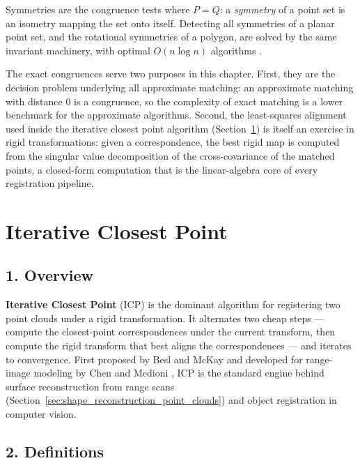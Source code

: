 Symmetries are the congruence tests where $P = Q$: a \emph{symmetry} of a
point set is an isometry mapping the set onto itself. Detecting all
symmetries of a planar point set, and the rotational symmetries of a
polygon, are solved by the same invariant machinery, with optimal
$O(n \log n)$ algorithms \cite{atallah1985symmetry,wolter1985,highnam1986}.

The exact congruences serve two purposes in this chapter. First, they are
the decision problem underlying all approximate matching: an approximate
matching with distance $0$ is a congruence, so the complexity of exact
matching is a lower benchmark for the approximate algorithms. Second, the
least-squares alignment used inside the iterative closest point algorithm
(Section~\ref{sec:matching_icp}) is itself an exercise in rigid
transformations: given a correspondence, the best rigid map is computed
from the singular value decomposition of the cross-covariance of the
matched points, a closed-form computation that is the linear-algebra core of
every registration pipeline.


\section{Iterative Closest Point}
\label{sec:matching_icp}

\subsection{1. Overview}

\textbf{Iterative Closest Point} (ICP) is the dominant algorithm for
registering two point clouds under a rigid transformation. It alternates two
cheap steps --- compute the closest-point correspondences under the current
transform, then compute the rigid transform that best aligns the
correspondences --- and iterates to convergence. First proposed by Besl and
McKay \cite{besl1992} and developed for range-image modeling by Chen and
Medioni \cite{chen1992}, ICP is the standard engine behind surface
reconstruction from range scans
(Section~\ref{sec:shape_reconstruction_point_clouds}) and object
registration in computer vision.

\subsection{2. Definitions}

